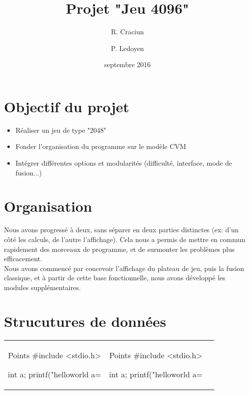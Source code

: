 \documentclass[12pt,a4paper]{article}
\author{R. Craciun \and P. Ledoyen}
\title{Projet "Jeu 4096"}
\date{septembre 2016}
\begin{document}
\maketitle

\section{Objectif du projet}
\begin{itemize}
\item Réaliser un jeu de type "2048"
\item Fonder l'organisation du programme sur le modèle CVM
\item Intégrer différentes options et modularités (difficulté, interface, mode de fusion...)
\end{itemize}

\section{Organisation}
Nous avons progressé à deux, sans séparer en deux parties distinctes (ex: d'un côté les calculs, de l'autre l'affichage). Cela nous a permis de mettre en commun rapidement des morceaux de programme,
et de surmonter les problèmes plus efficacement.\\

Nous avons commencé par concevoir l'affichage du plateau de jeu, puis la fusion classique, et à partir de cette base fonctionnelle, nous avons développé les modules supplémentaires.

\section{}

\section{Strucutures de données}
\begin{tabular}{ccc}
\begin{codeC}{Points}
#include <stdio.h>

int a;
printf("helloworld a=%

\end{codeC} 

&

\begin{codeC}{Points}
#include <stdio.h>

int a;
printf("helloworld a=%

\end{codeC} \\ 

\end{tabular} 
\end{document}
